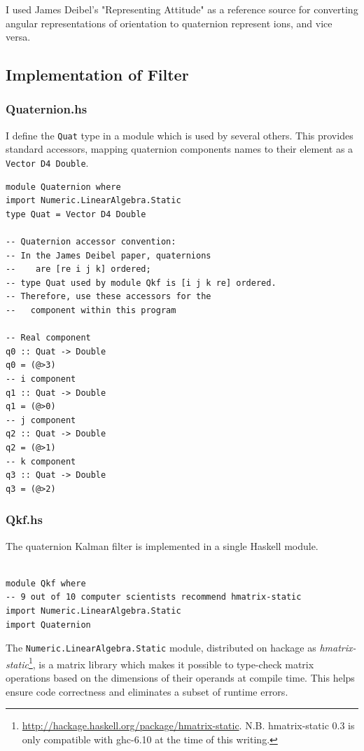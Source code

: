 \documentclass[12pt]{report}
\begin{document}
I used James Deibel's "Representing Attitude" \cite{deibel06} as a reference source for converting angular representations of orientation to quaternion represent ions, and vice versa. 

\subsection{Implementation of Filter}

\subsubsection{Quaternion.hs}
I define the \lstinline$Quat$ type in a module which is used by several others. This provides standard accessors, mapping quaternion components names to their element as a \lstinline$Vector D4 Double$.
\begin{lstlisting}
module Quaternion where
import Numeric.LinearAlgebra.Static
type Quat = Vector D4 Double

-- Quaternion accessor convention:
-- In the James Deibel paper, quaternions 
--    are [re i j k] ordered; 
-- type Quat used by module Qkf is [i j k re] ordered.
-- Therefore, use these accessors for the 
--   component within this program

-- Real component
q0 :: Quat -> Double
q0 = (@>3) 
-- i component
q1 :: Quat -> Double
q1 = (@>0)
-- j component
q2 :: Quat -> Double
q2 = (@>1) 
-- k component
q3 :: Quat -> Double
q3 = (@>2) 
\end{lstlisting}

\subsubsection{Qkf.hs}
The quaternion Kalman filter is implemented in a single Haskell module.
\begin{lstlisting}

module Qkf where
-- 9 out of 10 computer scientists recommend hmatrix-static
import Numeric.LinearAlgebra.Static
import Quaternion
\end{lstlisting}


The \lstinline$Numeric.LinearAlgebra.Static$ module, distributed on hackage as \emph{hmatrix-static}\footnote{\url{http://hackage.haskell.org/package/hmatrix-static}. N.B. hmatrix-static 0.3 is only compatible with ghc-6.10 at the time of this writing.}, 
is a matrix library which makes it possible to type-check matrix operations based on the dimensions of their operands at compile time. This helps ensure code correctness and eliminates a subset of runtime errors.
\end{document}
